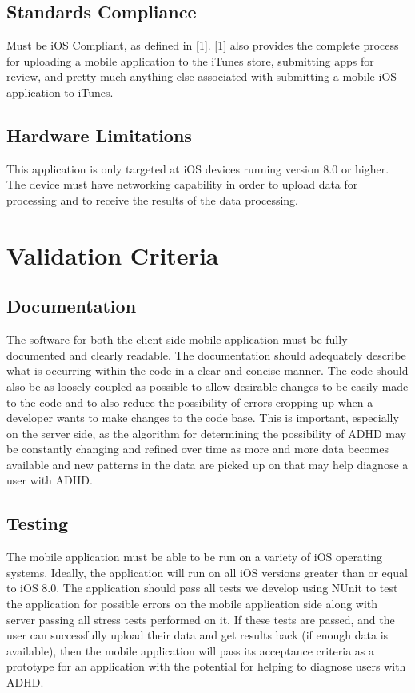 \documentclass[a4wide]{article}
\begin{document}
\subsection{Standards Compliance}

Must be iOS Compliant, as defined in [1]. [1] also provides the complete process for uploading a mobile application to the iTunes store, submitting apps for review, and pretty much anything else associated with submitting a mobile iOS application to iTunes.

\subsection{Hardware Limitations}

This application is only targeted at iOS devices running version 8.0 or 
higher. The device must have networking capability in order to upload data for processing and to receive the results of the data processing.



\section{Validation Criteria}

\subsection{Documentation}
The software for both the client side mobile application must be fully
documented and clearly readable. The documentation should adequately describe
what is occurring within the code in a clear and concise manner. The code should
also be as loosely coupled as possible to allow desirable changes to be easily
made to the code and to also reduce the possibility of errors cropping up when
a developer wants to make changes to the code base. This is important, especially
on the server side, as the algorithm for determining the possibility of ADHD may
be constantly changing and refined over time as more and more data becomes
available and new patterns in the data are picked up on that may help diagnose a
user with ADHD.
\subsection{Testing}
The mobile application must be able to be run on a variety of iOS operating
systems. Ideally, the application will run on all iOS versions greater than
or equal to iOS 8.0. The application should pass all 
tests we develop using NUnit to test the application for possible errors on the 
mobile application side along with server passing all stress tests performed on 
it. If these tests are passed, and the user can successfully upload their data and
get results back (if enough data is available), then the mobile application will 
pass its acceptance criteria as a prototype for an application with the potential 
for helping to diagnose users with ADHD.
\end{document}
